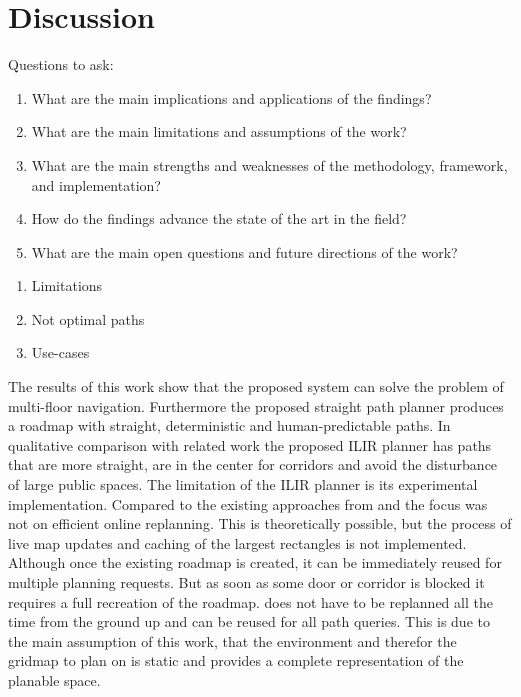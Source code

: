 \chapter{Discussion}
\label{sec:discussion}
Questions to ask:
\begin{enumerate}
    \item What are the main implications and applications of the findings? 
    \item What are the main limitations and assumptions of the work? 
    \item What are the main strengths and weaknesses of the methodology, framework, and implementation? 
    \item How do the findings advance the state of the art in the field? 
    \item What are the main open questions and future directions of the work? 
\end{enumerate}

\begin{enumerate}
    \item Limitations
    \item Not optimal paths
    \item Use-cases
\end{enumerate}

The results of this work show that the proposed system can solve the problem of multi-floor navigation. Furthermore the proposed straight path planner produces a roadmap with straight, deterministic and human-predictable paths. In qualitative comparison with related work the proposed ILIR planner has paths that are more straight, are in the center for corridors and avoid the disturbance of large public spaces. The limitation of the ILIR planner is its experimental implementation. Compared to the existing approaches from \cite{cagigas_hierarchical_2005} and \cite{seder_hierarchical_2011} the focus was not on efficient online replanning. This is theoretically possible, but the process of live map updates and caching of the largest rectangles is not implemented. Although once the existing roadmap is created, it can be immediately reused for multiple planning requests. But as soon as some door or corridor is blocked it requires a full recreation of the roadmap. does not have to be replanned all the time from the ground up and can be reused for all path queries. This is due to the main assumption of this work, that the environment and therefor the gridmap to plan on is static and provides a complete representation of the planable space. 

